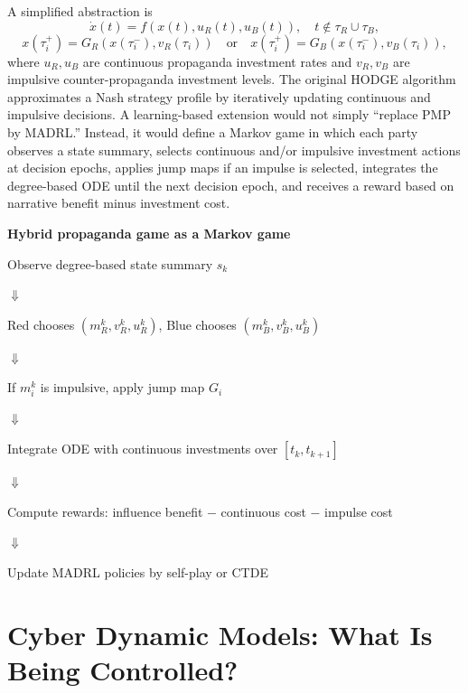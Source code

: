 \documentclass[11pt,a4paper]{article}
\begin{document}
A simplified abstraction is
\begin{equation}
\dot{x}(t)=f(x(t),u_R(t),u_B(t)),\quad t\notin \tau_R\cup\tau_B,
\end{equation}
\begin{equation}
x(\tau_i^+)=G_R(x(\tau_i^-),v_R(\tau_i))\quad \text{or}\quad
x(\tau_i^+)=G_B(x(\tau_i^-),v_B(\tau_i)),
\end{equation}
where $u_R,u_B$ are continuous propaganda investment rates and $v_R,v_B$ are impulsive counter-propaganda investment levels. The original HODGE algorithm approximates a Nash strategy profile by iteratively updating continuous and impulsive decisions. A learning-based extension would not simply ``replace PMP by MADRL.'' Instead, it would define a Markov game in which each party observes a state summary, selects continuous and/or impulsive investment actions at decision epochs, applies jump maps if an impulse is selected, integrates the degree-based ODE until the next decision epoch, and receives a reward based on narrative benefit minus investment cost.

\begin{flowbox}
\textbf{Hybrid propaganda game as a Markov game}\par
Observe degree-based state summary $s_k$\par
$\Downarrow$\par
Red chooses $(m_R^k,v_R^k,u_R^k)$, Blue chooses $(m_B^k,v_B^k,u_B^k)$\par
$\Downarrow$\par
If $m_i^k$ is impulsive, apply jump map $G_i$\par
$\Downarrow$\par
Integrate ODE with continuous investments over $[t_k,t_{k+1}]$\par
$\Downarrow$\par
Compute rewards: influence benefit $-$ continuous cost $-$ impulse cost\par
$\Downarrow$\par
Update MADRL policies by self-play or CTDE
\end{flowbox}


\section{Cyber Dynamic Models: What Is Being Controlled?}
\end{document}
